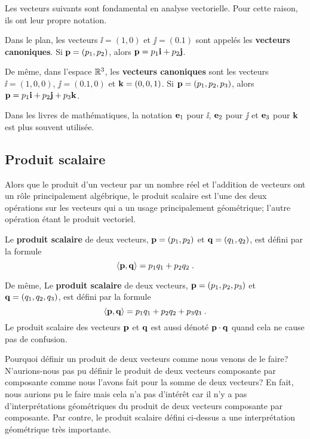 {Les vecteurs suivants sont fondamental en analyse vectorielle.  Pour
cette raison, ils ont leur propre notation.

\begin{defn} 
Dans le plan, les vecteurs $\ii = (1,0)$ et $\jj = (0.1)$ sont appelés
les {\bfseries vecteurs canoniques}.  Si
$\mathbf{p}=(p_1,p_2)$, alors $\displaystyle \mathbf{p} = p_1 \mathbf{i} + p_2 \mathbf{j}$.

De même, dans l'espace $\mathbb{R}^3$, les {\bfseries vecteurs canoniques}
sont les vecteurs $\ii = (1,0,0)$, $\jj = (0.1,0)$ et $\mathbf{k} = (0,0,1)$.  Si
$\mathbf{p}=(p_1,p_2,p_3)$, alors
$\displaystyle \mathbf{p} = p_1 \mathbf{i} + p_2 \mathbf{j} + p_3 \mathbf{k}$.
\end{defn}

Dans les livres de mathématiques, la notation
$\mathbf{e}_1$ pour $\ii$, $\mathbf{e}_2$ pour $\jj$ et $\mathbf{e}_3$ pour
$\mathbf{k}$ est plus souvent utilisée.

\subsection{Produit scalaire \eng}

Alors que le produit d'un vecteur par un nombre réel et l'addition de
vecteurs ont un rôle principalement algébrique, le produit scalaire est l'une
des deux opérations sur les vecteurs qui a un usage principalement
géométrique; l'autre opération étant le produit vectoriel.

\begin{defn} 
Le {\bfseries produit scalaire} de deux vecteurs,
$\mathbf{p} = (p_1,p_2)$ et $\mathbf{q} = (q_1,q_2)$, est défini par la
formule
\[
\left\langle{\mathbf{p}} , {\mathbf{q}}\right\rangle = p_1 q_1 + p_2 q_2  \; .
\]

De même, Le {\bfseries produit scalaire} de deux vecteurs,
$\mathbf{p} = (p_1,p_2,p_3)$ et $\mathbf{q} = (q_1,q_2,q_3)$, est défini
par la formule
\[
\left\langle{\mathbf{p}} , {\mathbf{q}}\right\rangle = p_1 q_1 + p_2 q_2 + p_3 q_3 \; .
\]
Le produit scalaire des vecteurs $\mathbf{p}$ et $\mathbf{q}$ est aussi
dénoté $\mathbf{p} \cdot \mathbf{q}$ quand cela ne cause pas de confusion.
\end{defn}

Pourquoi définir un produit de deux vecteurs comme nous venons de le faire?
N'aurions-nous pas pu définir le produit de deux vecteurs composante par
composante comme nous l'avons fait pour la somme de deux vecteurs?  En
fait, nous aurions pu le faire mais cela n'a pas d'intérêt car il n'y a pas
d'interprétations géométriques du produit de deux vecteurs composante par
composante.  Par contre, le produit scalaire défini ci-dessus a une
interprétation géométrique très importante.

}
